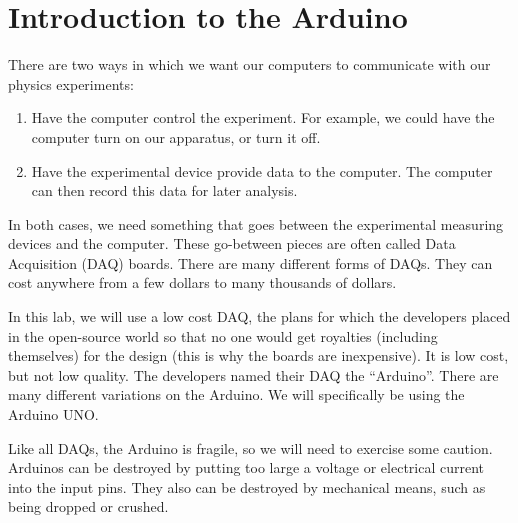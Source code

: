 \chapter{Introduction to the Arduino}



There are two ways in which we want our computers to communicate with our
physics experiments:
\begin{enumerate}
\item Have the computer control the experiment. For example, we could have the
computer turn on our apparatus, or turn it off. 
\item Have the experimental device provide data to the computer. The computer
can then record this data for later analysis.
\end{enumerate}
In both cases, we need something that goes between the
experimental measuring devices and the computer. These go-between pieces are
often called Data Acquisition (DAQ) boards. There are many different forms
of DAQs. They can cost anywhere from a few dollars to many thousands of
dollars.

In this lab, we will use a low cost DAQ, the plans for which the 
developers placed in the open-source world so that no one
would get royalties (including themselves) for the design (this is why the
boards are inexpensive). It is low cost, but not low
quality. The developers named their DAQ the ``Arduino''. There are many
different variations on the Arduino. We will specifically be using the
Arduino UNO.

Like all DAQs, the Arduino is fragile, so we will need to exercise some 
caution. Arduinos can be destroyed by putting too large a voltage or electrical 
current into the input pins. They also can be destroyed by mechanical means, 
such as being dropped or crushed.

